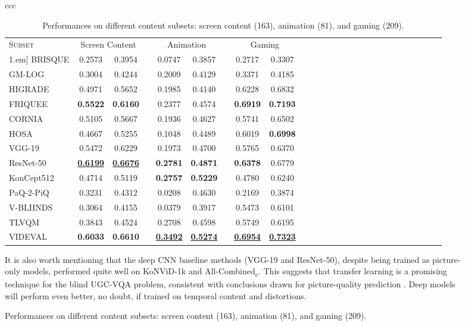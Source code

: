 \documentclass[journal]{IEEEtran}
\begin{document}
\begin{figure}[!t]
\begin{tabular}{ccc}
\begin{table}[!t]
\setlength{\tabcolsep}{4pt}
\renewcommand{\arraystretch}{1.1}
\centering
\caption{Performances on different content subsets: screen content (163), animation (81), and gaming (209).}
\label{table:content_breakdown}
\begin{tabular}{lccccccccccccccccccccccccc}
\toprule
\textsc{Subset} & \multicolumn{2}{c}{Screen Content} & & \multicolumn{2}{c}{Animation}  & & \multicolumn{2}{c}{Gaming} \\ \cline{2-3}\cline{5-6}\cline{8-9}\-1.em]
BRISQUE   & 0.2573 & 0.3954 & & 0.0747 & 0.3857 & & 0.2717 & 0.3307  \\
GM-LOG    & 0.3004 & 0.4244 & & 0.2009 & 0.4129 & & 0.3371 & 0.4185  \\
HIGRADE   & 0.4971 & 0.5652 & & 0.1985 & 0.4140 & & 0.6228 & 0.6832  \\
FRIQUEE   & \textbf{0.5522} & \textbf{0.6160} & & 0.2377 & 0.4574 & & \textbf{0.6919} & \textbf{0.7193}  \\
CORNIA    & 0.5105 & 0.5667 & & 0.1936 & 0.4627 & & 0.5741 & 0.6502  \\
HOSA      & 0.4667 & 0.5255 & & 0.1048 & 0.4489 & & 0.6019 & \textbf{0.6998}  \\
VGG-19     & 0.5472 & 0.6229 & & 0.1973 & 0.4700 & & 0.5765 & 0.6370  \\
ResNet-50  & \textbf{\underline{0.6199}} & \textbf{\underline{0.6676}} & & \textbf{0.2781} & \textbf{0.4871} & & \textbf{0.6378} & 0.6779  \\
{KonCept512} & 0.4714 & 0.5119 & & \textbf{0.2757} & \textbf{0.5229} & & 0.4780 & 0.6240  \\
{PaQ-2-PiQ} & 0.3231 & 0.4312 & & 0.0208 & 0.4630 & & 0.2169 & 0.3874 \\
V-BLIINDS & 0.3064 & 0.4155 & & 0.0379 & 0.3917 & & 0.5473 & 0.6101  \\
TLVQM     & 0.3843 & 0.4524 & & 0.2708 & 0.4598 & & 0.5749 & 0.6195 \\
VIDEVAL    & \textbf{{0.6033}} & \textbf{{0.6610}} & & \textbf{\underline{0.3492}}  & \textbf{\underline{0.5274}} & & \textbf{\underline{0.6954}} & \textbf{\underline{0.7323}}  \\
\bottomrule
\end{tabular}
\end{table}

It is also worth mentioning that the deep CNN baseline methods (VGG-19 and ResNet-50), despite being trained as picture-only models, performed quite well on KoNViD-1k and All-Combined\textsubscript{c}. This suggests that transfer learning is a promising technique for the blind UGC-VQA problem, consistent with conclusions drawn for picture-quality prediction \cite{kim2017deep}. Deep models will perform even better, no doubt, if trained on temporal content and distortions. 


\end{tabular}
\end{figure}
\end{document}
